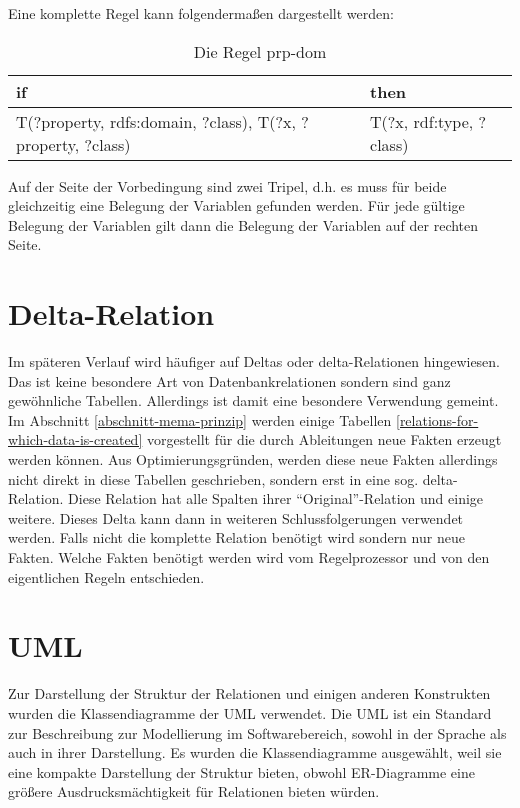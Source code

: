Eine komplette Regel kann folgendermaßen dargestellt werden:

\begin{table}[htb]
\begin{center}
\begin{tabular}{m{6cm}|m{4cm}}
if & then \\ \hline
T(?property, rdfs:domain, ?class),\newline
T(?x, ?property, ?class) & T(?x, rdf:type, ?class)
\end{tabular}
\end{center}
\caption{Die Regel prp-dom}
\label{rule-prp-dom}
\end{table}

Auf der Seite der Vorbedingung sind zwei Tripel, d.h. es muss für beide gleichzeitig eine Belegung der Variablen gefunden werden. Für jede gültige Belegung der Variablen gilt dann die Belegung der Variablen auf der rechten Seite.

\section{Delta-Relation}
Im späteren Verlauf wird häufiger auf Deltas oder delta-Relationen hingewiesen. Das ist keine besondere Art von Datenbankrelationen sondern sind ganz gewöhnliche Tabellen. Allerdings ist damit eine besondere Verwendung gemeint. Im Abschnitt \ref{abschnitt-mema-prinzip} werden einige Tabellen \ref{relations-for-which-data-is-created} vorgestellt für die durch Ableitungen neue Fakten erzeugt werden können. Aus Optimierungsgründen, werden diese neue Fakten allerdings nicht direkt in diese Tabellen geschrieben, sondern erst in eine sog. delta-Relation. Diese Relation hat alle Spalten ihrer ``Original''-Relation und einige weitere. Dieses Delta kann dann in weiteren Schlussfolgerungen verwendet werden. Falls nicht die komplette Relation benötigt wird sondern nur neue Fakten. Welche Fakten benötigt werden wird vom Regelprozessor und von den eigentlichen Regeln entschieden.


\section{UML}
Zur Darstellung der Struktur der Relationen und einigen anderen Konstrukten wurden die Klassendiagramme der UML \cite{UML2} verwendet. Die UML ist ein Standard zur Beschreibung zur Modellierung im Softwarebereich, sowohl in der Sprache als auch in ihrer Darstellung. Es wurden die Klassendiagramme ausgewählt, weil sie eine kompakte Darstellung der Struktur bieten, obwohl ER-Diagramme eine größere Ausdrucksmächtigkeit für Relationen bieten würden. \cite{Martin2003}

